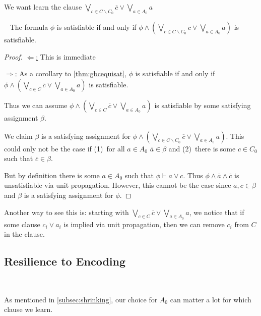 
We want learn the clause $\bigvee_{c \in C \backslash C_0} \overline{c} \lor \bigvee_{a \in A_0} a$


\begin{theorem}~\label{thm:shrunkgbcequisat}
    The formula $\phi$ is satisfiable if and only if $\phi \land (\bigvee_{c \in C \backslash C_0} \overline{c} \lor \bigvee_{a \in A_0} a)$ is satisfiable.
\end{theorem}

\begin{proof}
    \underline{$\Leftarrow$:} This is immediate


    \underline{$\Rightarrow$:}  As a corollary to \autoref{thm:gbcequisat}, $\phi$ is satisfiable if and only if $\phi \land (\bigvee_{c \in C} \overline{c} \lor \bigvee_{a \in A_0} a)$ is satisfiable.

    Thus we can assume $\phi \land (\bigvee_{c \in C} \overline{c} \lor \bigvee_{a \in A_0} a)$ is satisfiable by some satisfying assignment $\beta$.

    We claim $\beta$ is a satisfying assignment for $\phi \land (\bigvee_{c \in C \backslash C_0} \overline{c} \lor \bigvee_{a \in A_0} a)$. This could only not be the case if (1)~for all $a \in A_0$ $\overline{a} \in \beta$ and (2)~there is some $c \in C_0$ such that $\overline{c} \in \beta$. 

    But by definition there is some $a \in A_0$ such that $\phi \vdash a \lor c$. Thus $\phi \land \overline{a} \land \overline{c}$ is unsatisfiable via unit propagation. However, this cannot be the case since $\overline{a}, \overline{c} \in \beta$ and $\beta$ is a satisfying assignment for $\phi$.
\end{proof}

Another way to see this is: starting with $\bigvee_{c \in C} \overline{c} \lor \bigvee_{a \in A_0} a$, we notice that if some clause $c_i \lor a_i$ is implied via unit propagation, then we can remove $c_i$ from $C$ in the clause.

\subsection{Resilience to Encoding}~\label{subsec:sym}

As mentioned in \autoref{subsec:shrinking}, our choice for $A_0$ can matter a lot for which clause we learn. 


